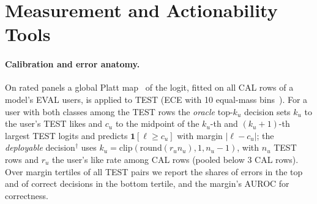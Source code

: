 \section{Measurement and Actionability Tools}
\label{sec:tools}\label{sec:method}

\paragraph{Calibration and error anatomy.}
On rated panels a global Platt map~\citep{platt2000probabilities} of the logit, fitted on all CAL rows of a model's EVAL users, is
applied to TEST (ECE with 10 equal-mass bins~\citep{naeini2015ece}). For a user with both classes among the TEST rows the
\emph{oracle} top-$k_u$ decision sets $k_u$ to the user's TEST likes and $c_u$ to the midpoint of the $k_u$-th and $(k_u{+}1)$-th
largest TEST logits and predicts $\mathbf 1[\ell\ge c_u]$ with margin $|\ell-c_u|$; the \emph{deployable} decision$^\dagger$ uses
$k_u=\mathrm{clip}(\mathrm{round}(r_un_u),1,n_u{-}1)$, with $n_u$ TEST rows and $r_u$ the user's like rate among CAL rows (pooled
below 3 CAL rows). Over margin tertiles of all TEST pairs we report the shares of errors in the top and of correct decisions in the
bottom tertile, and the margin's AUROC for correctness.

